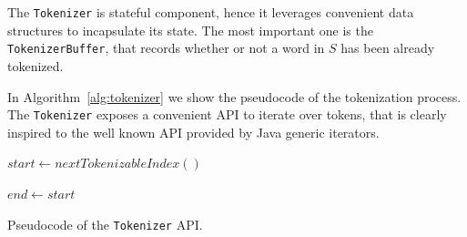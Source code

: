 The \texttt{Tokenizer} is stateful component, hence it leverages convenient data structures to incapsulate its state.
%
The most important one is the \texttt{TokenizerBuffer}, that records whether or not a word in $S$ has been already tokenized.

In Algorithm~\ref{alg:tokenizer} we show the pseudocode of the tokenization process.
%
The \texttt{Tokenizer} exposes a convenient API to iterate over tokens, that is clearly inspired to the well known API provided by Java generic iterators.

\begin{algorithm}[t]
	
	
	 {
		$start \leftarrow nextTokenizableIndex()$ \\
	
		$end \leftarrow start$ \\
		
	
	}
	\caption{Pseudocode of the \texttt{Tokenizer} API.}
	\label{alg:tokenizer}
\end{algorithm}

